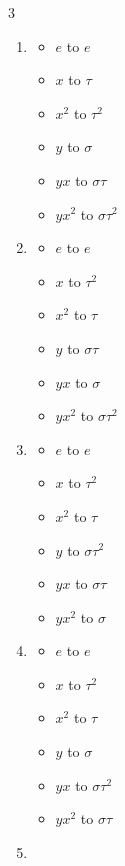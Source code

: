 \documentclass[12pt, letterpaper]{article}
\theoremstyle{definition}
\begin{document}
\begin{multicols}{3}
\begin{enumerate}
    \item \begin{itemize}
        \item $e$ to $e$
        \item $x$ to $\tau$
        \item $x^2$ to $\tau^2$
        \item $y$ to $\sigma$
        \item $yx$ to $\sigma\tau$
        \item $yx^2$ to $\sigma\tau^2$
        \end{itemize}
    \item \begin{itemize}
        \item $e$ to $e$
        \item $x$ to $\tau^2$
        \item $x^2$ to $\tau$
        \item $y$ to $\sigma\tau$
        \item $yx$ to $\sigma$
        \item $yx^2$ to $\sigma\tau^2$
        \end{itemize}
    \item \begin{itemize}
        \item $e$ to $e$
        \item $x$ to $\tau^2$
        \item $x^2$ to $\tau$
        \item $y$ to $\sigma\tau^2$
        \item $yx$ to $\sigma\tau$
        \item $yx^2$ to $\sigma$
        \end{itemize}
    \item \begin{itemize}
        \item $e$ to $e$
        \item $x$ to $\tau^2$
        \item $x^2$ to $\tau$
        \item $y$ to $\sigma$
        \item $yx$ to $\sigma\tau^2$
        \item $yx^2$ to $\sigma\tau$
        \end{itemize}
    \item \begin{itemize}

\end{itemize}
\end{enumerate}
\end{multicols}
\end{document}
